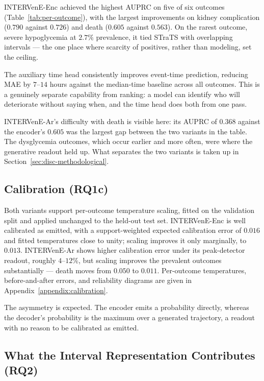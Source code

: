 INTERVenE-Enc achieved the highest AUPRC on five of six outcomes (Table~\ref{tab:per-outcome}), with the largest improvements on kidney complication ($0.790$ against $0.726$) and death ($0.605$ against $0.563$). On the rarest outcome, severe hypoglycemia at $2.7\%$ prevalence, it tied STraTS with overlapping intervals --- the one place where scarcity of positives, rather than modeling, set the ceiling.

The auxiliary time head consistently improves event-time prediction, reducing MAE by $7$--$14$ hours against the median-time baseline across all outcomes. This is a genuinely separate capability from ranking: a model can identify who will deteriorate without saying when, and the time head does both from one pass.

INTERVenE-Ar's difficulty with death is visible here: its AUPRC of $0.368$ against the encoder's $0.605$ was the largest gap between the two variants in the table. The dysglycemia outcomes, which occur earlier and more often, were where the generative readout held up. What separates the two variants is taken up in Section~\ref{sec:disc-methodological}.

\subsection{Calibration (RQ1c)}

Both variants support per-outcome temperature scaling, fitted on the validation split and applied unchanged to the held-out test set. INTERVenE-Enc is well calibrated as emitted, with a support-weighted expected calibration error of $0.016$ and fitted temperatures close to unity; scaling improves it only marginally, to $0.013$. INTERVenE-Ar shows higher calibration error under its peak-detector readout, roughly $4$--$12\%$, but scaling improves the prevalent outcomes substantially --- death moves from $0.050$ to $0.011$. Per-outcome temperatures, before-and-after errors, and reliability diagrams are given in Appendix~\ref{appendix:calibration}.

The asymmetry is expected. The encoder emits a probability directly, whereas the decoder's probability is the maximum over a generated trajectory, a readout with no reason to be calibrated as emitted.

\subsection{What the Interval Representation Contributes (RQ2)}

